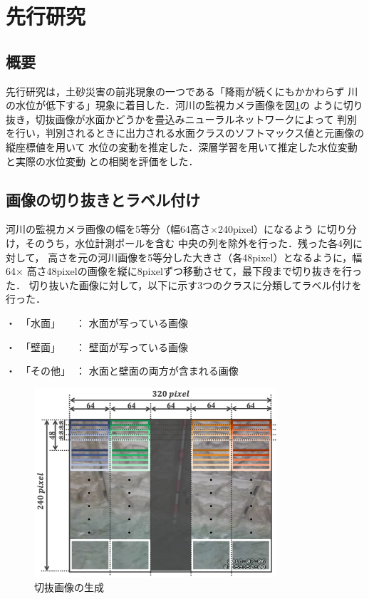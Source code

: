 \section{先行研究\cite{watanabe}}
\subsection{概要}
\label{3.1}
先行研究\cite{watanabe}は，土砂災害の前兆現象の一つである「降雨が続くにもかかわらず
川の水位が低下する」現象に着目した．河川の監視カメラ画像を図\ref{kirinuki}の
ように切り抜き，切抜画像が水面かどうかを畳込みニューラルネットワークによって
判別を行い，判別されるときに出力される水面クラスのソフトマックス値と元画像の縦座標値を用いて
水位の変動を推定した．深層学習を用いて推定した水位変動と実際の水位変動
との相関を評価をした．

\subsection{画像の切り抜きとラベル付け}
\label{3.2}
河川の監視カメラ画像の幅を5等分（幅64高さ×240pixel）になるよう
に切り分け，そのうち，水位計測ポールを含む
中央の列を除外を行った．残った各4列に対して，
高さを元の河川画像を5等分した大きさ（各48pixel）となるように，幅64×
高さ48pixelの画像を縦に8pixelずつ移動させて，最下段まで切り抜きを行った．
切り抜いた画像に対して，以下に示す3つのクラスに分類してラベル付けを行った．
\begin{description}
    \item・　「水面」　　： 水面が写っている画像
    \vspace{-2mm}
    \item・　「壁面」　　： 壁面が写っている画像
    \vspace{-2mm}
    \item・　「その他」　： 水面と壁面の両方が含まれる画像
\end{description}

\vspace{2mm}
\begin{figure}[h] 
  \begin{center}
    \includegraphics[width=90mm]{figs/kirinuki.png}
  \end{center}
  \caption{切抜画像の生成}
  \label{kirinuki}
\end{figure}

